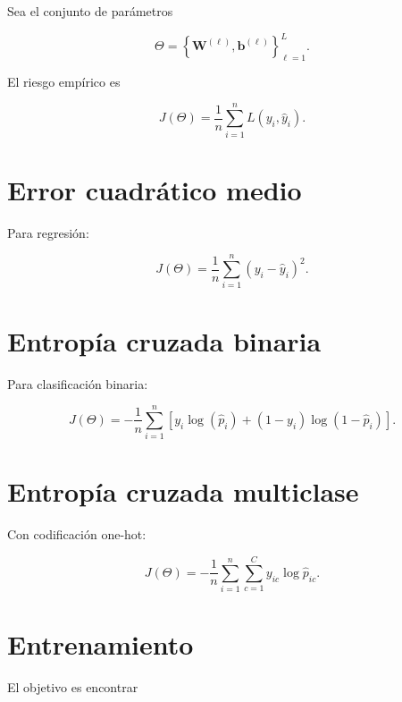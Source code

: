 \documentclass[
  spanish,
  10.5pt,
  letterpaper,
  DIV=11,
  numbers=noendperiod,
  oneside,
  open=any]{scrreprt}
\theoremstyle{definition}
\theoremstyle{definition}
\theoremstyle{plain}
\theoremstyle{remark}
\begin{document}
Sea el conjunto de parámetros

\[
\Theta
=
\left\{
\mathbf{W}^{(\ell)},
\mathbf{b}^{(\ell)}
\right\}_{\ell=1}^{L}.
\]

El riesgo empírico es

\[
J(\Theta)
=
\frac{1}{n}
\sum_{i=1}^{n}
L
\left(
y_i,
\widehat{y}_i
\right).
\]

\section*{Error cuadrático medio}\label{error-cuadruxe1tico-medio-2}


Para regresión:

\[
J(\Theta)
=
\frac{1}{n}
\sum_{i=1}^{n}
\left(
y_i-\widehat{y}_i
\right)^2.
\]

\section*{Entropía cruzada binaria}\label{entropuxeda-cruzada-binaria}


Para clasificación binaria:

\[
J(\Theta)
=
-
\frac{1}{n}
\sum_{i=1}^{n}
\left[
y_i\log(\widehat{p}_i)
+
(1-y_i)
\log
(1-\widehat{p}_i)
\right].
\]

\section*{Entropía cruzada
multiclase}\label{entropuxeda-cruzada-multiclase}


Con codificación one-hot:

\[
J(\Theta)
=
-
\frac{1}{n}
\sum_{i=1}^{n}
\sum_{c=1}^{C}
y_{ic}
\log
\widehat{p}_{ic}.
\]

\section*{Entrenamiento}\label{entrenamiento-2}


El objetivo es encontrar
\end{document}
